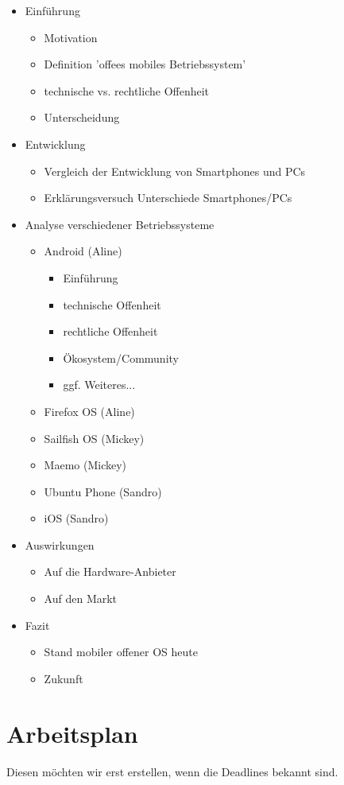 \documentclass{article}
\begin{document}
\begin{itemize}
    \item Einf\"{u}hrung
    \begin{itemize}
        \item Motivation
        \item Definition 'offees mobiles Betriebssystem'
        \item technische vs. rechtliche Offenheit
        \item Unterscheidung
    \end{itemize}
    \item Entwicklung
    \begin{itemize}
        \item Vergleich der Entwicklung von Smartphones und PCs
        \item Erkl\"{a}rungsversuch Unterschiede Smartphones/PCs
    \end{itemize}
    \item Analyse verschiedener Betriebssysteme
    \begin{itemize}
        \item Android (Aline)
		\begin{itemize}
			\item Einf\"{u}hrung
			\item technische Offenheit
			\item rechtliche Offenheit
			\item \"{O}kosystem/Community
			\item ggf. Weiteres...
		\end{itemize}
        \item Firefox OS (Aline)
        \item Sailfish OS (Mickey)
        \item Maemo (Mickey)
        \item Ubuntu Phone (Sandro)
        \item iOS (Sandro)
    \end{itemize}
    \item Auswirkungen
    \begin{itemize}
        \item Auf die Hardware-Anbieter
        \item Auf den Markt
    \end{itemize}
    \item Fazit
    \begin{itemize}
        \item Stand mobiler offener OS heute
        \item Zukunft
    \end{itemize}
\end{itemize}



\section{Arbeitsplan}
Diesen m\"{o}chten wir erst erstellen, wenn die Deadlines bekannt sind.
\end{document}
